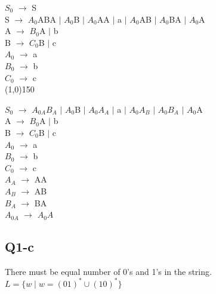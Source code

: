 \documentclass{article}
\begin{document}
\begin{multicols}{2}
\begin{minipage}{0.5\textwidth}
		$S_0$ $\rightarrow$ S\\
		S $\rightarrow$ $A_0$ABA $\mid$ $A_0$B $\mid$ $A_0$AA $\mid$ a $\mid$ $A_0$AB $\mid$ $A_0$BA $\mid$ $A_0$A\\
		A $\rightarrow$ $B_0$A $\mid$ b \\
		B $ \rightarrow $ $C_0$B $ \mid $ c \\
		$A_0$ $ \rightarrow $ a \\
		$B_0$ $ \rightarrow $ b \\
		$C_0$ $ \rightarrow $ c \\
				\line(1,0){150}\\
	\end{minipage}
	\begin{minipage}{0.5\textwidth}
		$S_0$ $\rightarrow$ $A_{0A}B_A$ $\mid$ $A_0$B $\mid$ $A_0A_A$ $\mid$ a $\mid$ $A_0A_B$ $\mid$ $A_0B_A$ $\mid$ $A_0$A\\
		A $\rightarrow$ $B_0$A $\mid$ b \\
		B $ \rightarrow $ $C_0$B $ \mid $ c \\
		$A_0$ $ \rightarrow $ a \\
		$B_0$ $ \rightarrow $ b \\
		$C_0$ $ \rightarrow $ c \\
		$A_A$ $ \rightarrow $ AA \\
		$A_B$ $ \rightarrow $ AB \\
		$B_A$ $ \rightarrow $ BA \\
		$A_{0A}$ $ \rightarrow $ $A_0A$ \\
		
	\end{minipage}
\end{multicols}
\newpage
\subsection{Q1-c}
There must be equal number of 0's and 1's in the string. $L = \{ w \mid  w = (01)^* \cup (10)^*\}$
\end{document}
